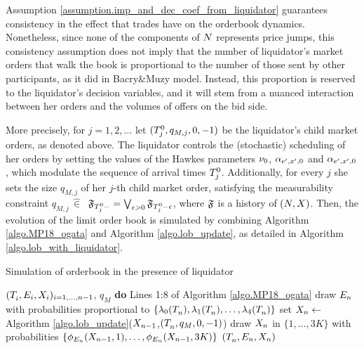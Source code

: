 \documentclass[10pt, article,table]{article}
\begin{document}
Assumption \ref{assumption.imp_and_dec_coef_from_liquidator} guarantees consistency in the effect that trades have on the orderbook dynamics. Nonetheless, since none of the components of $\multiCountingProc$ represents price jumps, this consistency assumption does not imply that the number of liquidator's market orders that  walk the book  is proportional to the number of those sent by other participants, as it did in Bacry\&Muzy model. Instead, this proportion is reserved to the liquidator's decision variables, and it will stem from a nuanced interaction between her orders and the volumes of offers on the bid side. 

More precisely, for $j=1,2,\dots$ let $(\arrivalTimes[0]_j, q_{M,j},0,-1)$ be the liquidator's child market orders, as denoted above. The liquidator controls the (stochastic) scheduling of her orders by setting the values of the Hawkes parameters $\baseRate_0$, $\impCoef_{\eone,\xone,0}$ and $\impCoef_{\eone,\xone,0}$, which modulate the sequence of arrival times $\arrivalTimes[0]_j$. Additionally, for every $j$ she sets the size $q_{M,j}$ of her $j$-th child market order, satisfying the measurability constraint $q_{M,j} \, \hat{\in} \, $ $ \filtrationF_{\arrivalTimes[0]_j -} = \bigvee_{\epsilon>0}\filtrationF_{\arrivalTimes[0]_j -\epsilon}$, where $\filtrationF$ is a history of $(\multiCountingProc,\stateVariable)$.  Then, the evolution of the limit order book is simulated by combining Algorithm \ref{algo.MP18_ogata} and Algorithm \ref{algo.lob_update}, as detailed in Algorithm \ref{algo.lob_with_liquidator}.

\begin{algorithm}[h]
\caption{Simulation of orderbook in the presence of liquidator}
\label{algo.lob_with_liquidator}
 \begin{algorithmic}[5]
  \REQUIRE $(\arrivalTimes[]_i,\event[i],\stateVariable_i)_{i=1,\dots,n-1}$, $q_M$
  \STATE \textbf{do} Lines 1:8 of Algorithm \ref{algo.MP18_ogata}
  \STATE draw $\event[n]$ with probabilities proportional to $\lbrace \intensity[0](\arrivalTimes[]_n),\intensity[1](\arrivalTimes[]_n),\dots,\intensity[4](\arrivalTimes[]_n)\rbrace$
  \STATE set $\stateVariable_n \leftarrow$ Algorithm \ref{algo.lob_update}($\stateVariable_{n-1}$,$(\arrivalTimes[]_n,q_M,0,-1)$)
  \ELSE
  \STATE draw $\stateVariable_n$ in $\lbrace 1,\dots,3K\rbrace$ with probabilities $\lbrace \transProb_{\event}(\stateVariable_{n-1},1), \dots,\transProb_{\event}(\stateVariable_{n-1},3K)\rbrace$
  \ENDIF
  \RETURN $(\arrivalTimes[]_n,\event[n],\stateVariable_n)$
 \end{algorithmic}
\end{algorithm}
\end{document}
